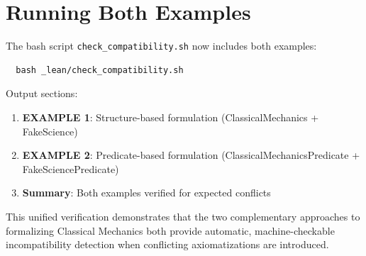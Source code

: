 \documentclass[11pt]{article}
\begin{document}
\section{Running Both Examples}

The bash script \texttt{check\_compatibility.sh} now includes both examples:
\begin{verbatim}
  bash _lean/check_compatibility.sh
\end{verbatim}

Output sections:
\begin{enumerate}
  \item \textbf{EXAMPLE 1}: Structure-based formulation
    (ClassicalMechanics + FakeScience)
  \item \textbf{EXAMPLE 2}: Predicate-based formulation
    (ClassicalMechanicsPredicate + FakeSciencePredicate)
  \item \textbf{Summary}: Both examples verified for expected conflicts
\end{enumerate}

This unified verification demonstrates that the two complementary approaches
to formalizing Classical Mechanics both provide automatic, machine-checkable
incompatibility detection when conflicting axiomatizations are introduced.



\end{document}
